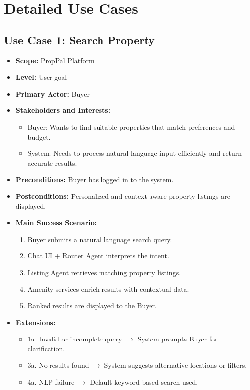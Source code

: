 \section{Detailed Use Cases}

\subsection{Use Case 1: Search Property}

\begin{itemize}
    \item \textbf{Scope:} PropPal Platform
    \item \textbf{Level:} User-goal
    \item \textbf{Primary Actor:} Buyer
    \item \textbf{Stakeholders and Interests:}
    \begin{itemize}
        \item Buyer: Wants to find suitable properties that match preferences and budget.
        \item System: Needs to process natural language input efficiently and return accurate results.
    \end{itemize}
    \item \textbf{Preconditions:} Buyer has logged in to the system.
    \item \textbf{Postconditions:} Personalized and context-aware property listings are displayed.
    \item \textbf{Main Success Scenario:}
    \begin{enumerate}
        \item Buyer submits a natural language search query.
        \item Chat UI + Router Agent interprets the intent.
        \item Listing Agent retrieves matching property listings.
        \item Amenity services enrich results with contextual data.
        \item Ranked results are displayed to the Buyer.
    \end{enumerate}
    \item \textbf{Extensions:}
    \begin{itemize}
        \item 1a. Invalid or incomplete query $\rightarrow$ System prompts Buyer for clarification.
        \item 3a. No results found $\rightarrow$ System suggests alternative locations or filters.
        \item 4a. NLP failure $\rightarrow$ Default keyword-based search used.
    \end{itemize}
\end{itemize}


